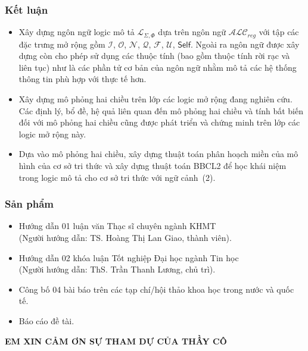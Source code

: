 \documentclass[fleqn]{beamer}
\newcommand{\mL}		{\mathcal{L}}
\newcommand{\mI}		{\mathcal{I}}
\newcommand{\mO}		{\mathcal{O}}
\newcommand{\mN}		{\mathcal{N}}
\newcommand{\mQ}		{\mathcal{Q}}
\newcommand{\mF}		{\mathcal{F}}
\newcommand{\mU}		{\mathcal{U}}
\newcommand{\Self}		{\mathsf{Self}}
\newcommand{\mLSP}		{\mL_{\Sigma,\Phi}}
\newcommand{\ALCreg}	{$\mathcal{ALC}_{reg}$\xspace}
\newcommand{\BBCLearnS}		{BBCL2\xspace}
\begin{document}
\begin{frame}\frametitle{\bf Kết luận}
	\begin{itemize}
		\item Xây dựng ngôn ngữ logic mô tả $\mLSP$ dựa trên ngôn ngữ \ALCreg với tập các đặc trưng mở rộng gồm $\mI$, $\mO$, $\mN$, $\mQ$, $\mF$, $\mU$, $\Self$. Ngoài ra ngôn ngữ được xây dựng còn cho phép sử dụng các thuộc tính (bao gồm thuộc tính rời rạc và liên tục) như là các phần tử cơ bản của ngôn ngữ nhằm mô tả các hệ thống thông tin phù hợp với thực tế hơn.
		
		\item Xây dựng mô phỏng hai chiều trên lớp các logic mở rộng đang nghiên cứu. Các định lý, bổ đề, hệ quả liên quan đến mô phỏng hai chiều và tính bất biến đối với mô phỏng hai chiều cũng được phát triển và chứng minh trên lớp các logic mở rộng này.
		
		\item Dựa vào mô phỏng hai chiều, xây dựng thuật toán phân hoạch miền của mô hình của cơ sở tri thức và xây dựng thuật toán \BBCLearnS để học khái niệm trong logic mô tả cho cơ sở tri thức với ngữ cảnh~(2).
	\end{itemize}
\end{frame}
\begin{frame}\frametitle{\bf Sản phẩm}
\begin{itemize}
	\item Hướng dẫn 01 luận văn Thạc sĩ chuyên ngành KHMT\\
	(Người hướng dẫn: TS. Hoàng Thị Lan Giao, thành viên).
	\vspace{1.5ex}
	\item Hướng dẫn 02 khóa luận Tốt nghiệp Đại học ngành Tin học\\
	(Người hướng dẫn: ThS. Trần Thanh Lương, chủ trì).
	\vspace{1.5ex}
	\item Công bố 04 bài báo trên các tạp chí/hội thảo khoa học trong nước và quốc tế.
	\vspace{1.5ex}
	\item Báo cáo đề tài.
\end{itemize}
\end{frame}

\begin{frame}{}
\begin{center}
  \large{\textbf{EM XIN CẢM ƠN SỰ THAM DỰ CỦA THẦY CÔ}}
\end{center}
\end{frame}
\end{document}
